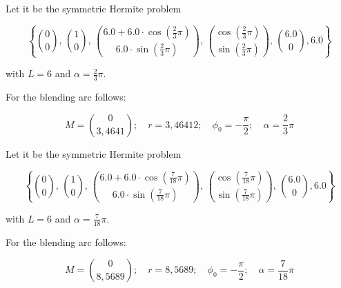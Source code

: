 \BEISPIEL
{
  Let it be the symmetric Hermite problem 

  $$\left\{\binom{0}{0},\, \binom{1}{0},\,
    \binom{6.0+6.0\cdot \cos\left(\frac{2}{3}\pi\right)}{6.0\cdot \sin\left(\frac{2}{3}\pi\right)},\, \binom{\cos\left(\frac{2}{3}\pi\right)}{\sin\left(\frac{2}{3}\pi\right)},\, \binom{6.0}{0},6.0\right\}
  $$

  with $L=6$ and $\alpha=\frac{2}{3}\pi$.

  For the blending arc follows:

  $$M=\binom{0}{3,4641}; \quad r=3,46412;\quad \phi_0 = -\frac{\pi}{2}; \quad \alpha=\frac{2}{3}\pi$$

  \begin{center}
  \end{center}
}


\BEISPIEL
{
  Let it be the symmetric Hermite problem 
  
  $$\left\{\binom{0}{0},\, \binom{1}{0},\,
  \binom{6.0+6.0\cdot \cos\left(\frac{7}{18}\pi\right)}{6.0\cdot \sin\left(\frac{7}{18}\pi\right)},\, \binom{\cos\left(\frac{7}{18}\pi\right)}{\sin\left(\frac{7}{18}\pi\right)},\, \binom{6.0}{0},6.0\right\}$$
  
  with $L=6$ and $\alpha=\frac{7}{18}\pi$.
  
  For the blending arc follows:
  
  $$M=\binom{0}{8,5689}; \quad r=8,5689;\quad \phi_0 = -\frac{\pi}{2}; \quad \alpha=\frac{7}{18}\pi$$
  
  
  \begin{center}
  \end{center}
}



